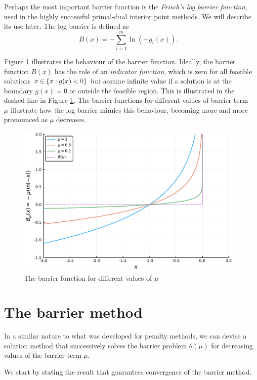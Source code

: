 Perhaps the most important barrier function is the \emph{Frisch's log barrier function}, used in the highly successful primal-dual interior point methods. We will describe its use later. The log barrier is defined as
$$
B(x) = - \sum_{i=1}^m \ln(-g_i(x)). 
$$

Figure \ref{fig:different_mu} illustrates the behaviour of the barrier function. Ideally, the barrier function $B(x)$ has the role of an \emph{indicator function}, which is zero for all feasible solutions $x \in \left\{ x : g(x) < 0 \right \}$ but assume infinite value if a solution is at the boundary $g(x)=0$ or outside the feasible region. This is illustrated in the dashed line in Figure \ref{fig:different_mu}. The barrier functions for different values of barrier term $\mu$ illustrate how the log barrier mimics this behaviour, becoming more and more pronounced as $\mu$ decreases.

\begin{figure}
	\includegraphics[width=\textwidth]{part_2/chapter_10/figures/different_mu.pdf}
	\caption{The barrier function for different values of $\mu$} \label{fig:different_mu}
\end{figure}

\section{The barrier method}

In a similar nature to what was developed for penalty methods, we can devise a solution method that successively solves the barrier problem $\theta(\mu)$ for decreasing values of the barrier term $\mu$. 

We start by stating the result that guarantees convergence of the barrier method. 

